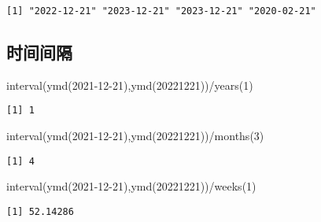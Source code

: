 \documentclass[
  letterpaper,
  DIV=11,
  numbers=noendperiod]{scrreprt}
\newenvironment{Shaded}{\begin{snugshade}}{\end{snugshade}}
\newcommand{\DecValTok}[1]{\textcolor[rgb]{0.68,0.00,0.00}{#1}}
\newcommand{\FunctionTok}[1]{\textcolor[rgb]{0.28,0.35,0.67}{#1}}
\newcommand{\NormalTok}[1]{\textcolor[rgb]{0.00,0.23,0.31}{#1}}
\newcommand{\SpecialCharTok}[1]{\textcolor[rgb]{0.37,0.37,0.37}{#1}}
\newcommand{\StringTok}[1]{\textcolor[rgb]{0.13,0.47,0.30}{#1}}
\begin{document}
\begin{verbatim}
[1] "2022-12-21" "2023-12-21" "2023-12-21" "2020-02-21"
\end{verbatim}

\subsection{时间间隔}\label{ux65f6ux95f4ux95f4ux9694}

\begin{Shaded}
\begin{Highlighting}[]
\FunctionTok{interval}\NormalTok{(}\FunctionTok{ymd}\NormalTok{(}\StringTok{\textquotesingle{}2021{-}12{-}21\textquotesingle{}}\NormalTok{),}\FunctionTok{ymd}\NormalTok{(}\StringTok{\textquotesingle{}20221221\textquotesingle{}}\NormalTok{))}\SpecialCharTok{/}\FunctionTok{years}\NormalTok{(}\DecValTok{1}\NormalTok{)}
\end{Highlighting}
\end{Shaded}

\begin{verbatim}
[1] 1
\end{verbatim}

\begin{Shaded}
\begin{Highlighting}[]
\FunctionTok{interval}\NormalTok{(}\FunctionTok{ymd}\NormalTok{(}\StringTok{\textquotesingle{}2021{-}12{-}21\textquotesingle{}}\NormalTok{),}\FunctionTok{ymd}\NormalTok{(}\StringTok{\textquotesingle{}20221221\textquotesingle{}}\NormalTok{))}\SpecialCharTok{/}\FunctionTok{months}\NormalTok{(}\DecValTok{3}\NormalTok{)}
\end{Highlighting}
\end{Shaded}

\begin{verbatim}
[1] 4
\end{verbatim}

\begin{Shaded}
\begin{Highlighting}[]
\FunctionTok{interval}\NormalTok{(}\FunctionTok{ymd}\NormalTok{(}\StringTok{\textquotesingle{}2021{-}12{-}21\textquotesingle{}}\NormalTok{),}\FunctionTok{ymd}\NormalTok{(}\StringTok{\textquotesingle{}20221221\textquotesingle{}}\NormalTok{))}\SpecialCharTok{/}\FunctionTok{weeks}\NormalTok{(}\DecValTok{1}\NormalTok{)}
\end{Highlighting}
\end{Shaded}

\begin{verbatim}
[1] 52.14286
\end{verbatim}
\end{document}
